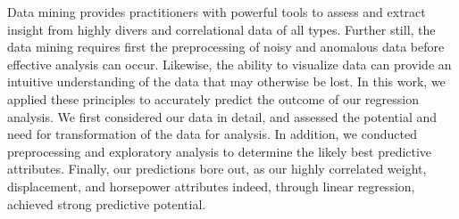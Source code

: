 \documentclass[10pt, conference, compsocconf]{IEEEtran}
\begin{document}
Data mining provides practitioners with powerful tools to assess and extract insight from highly divers and correlational data of all types. Further still, the data mining requires first the preprocessing of noisy and anomalous data before effective analysis can occur. Likewise, the ability to visualize data can provide an intuitive understanding of the data that may otherwise be lost. In this work, we applied these principles to accurately predict the outcome of our regression analysis. We first considered our data in detail, and assessed the potential and need for transformation of the data for analysis. In addition, we conducted preprocessing and exploratory analysis to determine the likely best predictive attributes. Finally, our predictions bore out, as our highly correlated weight, displacement, and horsepower attributes indeed, through linear regression, achieved strong predictive potential. 

%
%
\end{document}
